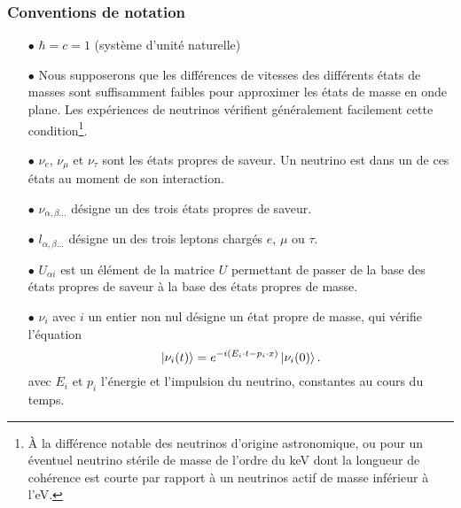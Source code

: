       \subsubsection{Conventions de notation}
        \begin{itemize}
          \item[$\bullet$] $\hbar = c = 1$ (système d'unité naturelle)
          \item[$\bullet$] Nous supposerons que les différences de vitesses des différents états de masses sont suffisamment faibles pour approximer les états de masse en onde plane. Les expériences de neutrinos vérifient généralement facilement cette condition\footnote{À la différence notable des neutrinos d'origine astronomique, ou pour un éventuel neutrino stérile de masse de l'ordre du \si{\kilo\eV} dont la longueur de cohérence est courte par rapport à un neutrinos actif de masse inférieur à l'\si{\eV}.}.
          \item[$\bullet$] $\nu_e$, $\nu_{\mu}$ et $\nu_{\tau}$ sont les états propres de saveur. Un neutrino est dans un de ces états au moment de son interaction.
          \item[$\bullet$] $\nu_{\alpha,\beta...}$ désigne un des trois états propres de saveur.
          \item[$\bullet$] $l_{\alpha,\beta...}$ désigne un des trois leptons chargés $e$, $\mu$ ou $\tau$.
          \item[$\bullet$] $U_{\alpha i}$ est un élément de la matrice $U$ permettant de passer de la base des états propres de saveur à la base des états propres de masse.
          \item[$\bullet$] $\nu_{i}$ avec $i$ un entier non nul désigne un état propre de masse, qui vérifie l'équation
          \begin{equation}
            \ket{\nu_i(t)} = e^{-i(E_i\cdot t - p_i\cdot x)}\ket{\nu_i(0)}.
          \end{equation}
          avec $E_i$ et $p_i$ l'énergie et l'impulsion du neutrino, constantes au cours du temps.
        \end{itemize}

